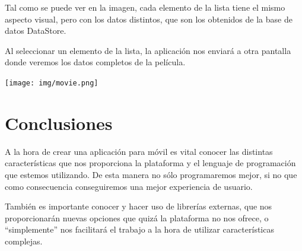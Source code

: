 \documentclass{\ClassPath/viu-tfm-template}
\begin{document}
Tal como se puede ver en la imagen, cada elemento de la lista tiene el mismo aspecto visual, pero con los datos distintos, que son los obtenidos de la base de datos DataStore.

Al seleccionar un elemento de la lista, la aplicación nos enviará a otra pantalla donde veremos los datos completos de la película.

\begin{center}
    \texttt{[image: img/movie.png]}
\end{center}

\chapter{Conclusiones}

A la hora de crear una aplicación para móvil es vital  conocer las distintas características que nos proporciona la plataforma y el lenguaje de programación que estemos utilizando. De esta manera no sólo programaremos mejor, si no que como consecuencia conseguiremos una mejor experiencia de usuario.

También es importante conocer y hacer uso de librerías externas, que nos proporcionarán nuevas opciones que quizá la plataforma no nos ofrece, o “simplemente” nos facilitará el trabajo a la hora de utilizar características complejas.
\end{document}

